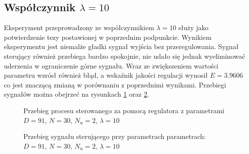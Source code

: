 \subsection{Współczynnik $\lambda = 10$}
Eksperyment przeprowadzony ze współczynnikiem $\lambda = 10$ służy jako potwierdzenie tezy postawionej w poprzednim podpunkcie. Wynikiem eksperymentu jest niemalże gładki sygnał wyjścia bez przeregulowania. Sygnał sterujący również przebiega bardzo spokojnie, nie udało się jednak wyeliminować uderzenia w ograniczenie górne sygnału. Wraz ze zwiększeniem wartości parametru wzrósł również błąd, a wskaźnik jakości regulacji wynosił $E = \num{3,9606}$ co jest znaczącą zmianą w porównaniu z poprzednimi wynikami. Przebiegi sygnałów można obejrzeć na rysunkach \ref{dmc_lam_10_y} oraz \ref{dmc_lam_10_u}.
	
\begin{figure}[b]
    \centering
    \caption{Przebieg procesu sterowanego za pomocą regulatora z parametrami $D = 91$, $N = 30$, $N_{\mathrm{u}} = 2$, $\lambda = 10$}
    \label{dmc_lam_10_y}
\end{figure}

\begin{figure}[b]
    \centering
    \caption{Przebieg sygnału sterującego przy parametrach parametrach: $D = 91$, $N = 30$, $N_{\mathrm{u}} = 2$, $\lambda = 10$}
    \label{dmc_lam_10_u}
\end{figure}

